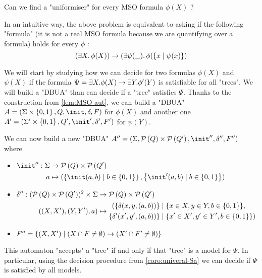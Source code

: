\documentclass{article}
\begin{document}
\begin{problem}
Can we find a "uniformiser" for every MSO formula $\phi(X)$ ?
\end{problem}


In an intuitive way, the above problem is equivalent to asking if the following "formula" (it is not a real MSO formula
because we are quantifying over a formula) holds for every $\phi$ :
\[ (\exists X.\, \phi(X)) \rightarrow (\exists \psi(\_).\, \phi(\left\{x \mid \psi(x)\right\} ) \]

We will start by studying how we can decide for two formulas $\phi(X)$ and $\psi(X)$ if the formula $\Psi = \exists X. \phi (X) \rightarrow \exists Y. \phi' (Y)$
is satisfiable for all "trees". We will build a "DBUA" than can decide if a "tree" satisfies $\Psi$.
Thanks to the construction from \ref{lem:MSO-aut}, we can build a "DBUA" $A = (\Sigma \times \set{0,1}, Q, \init, \delta, F)$ for $\phi(X)$
and another one $A' = (\Sigma' \times \set{0,1}, Q', \init', \delta', F')$ for $\psi(Y)$.

We can now build a new "DBUA" $A'' = (\Sigma, \parts Q \times \parts {Q'}, \init'', \delta'', F'')$ where
\begin{itemize}
	\item$\begin{aligned}[t]
			      \init'' : \Sigma & \to      \parts Q \times \parts {Q'}                                                          \\
			      a                & \mapsto  ( \setdef{ \init(a,b) } {b \in \set{0,1}}, \setdef{ \init'(a,b) } {b \in \set{0,1}})
		      \end{aligned}$

	\item$\begin{aligned}[t]
			      \delta'' : (\mathcal{P}\left(Q\right) \times \mathcal{P}\left(Q'\right))^2 \times \Sigma & \to      \mathcal{P}\left(Q\right) \times \mathcal{P}\left(Q'\right)                                                 \\
			      ((X,X'),(Y,Y'),a)                                        & \mapsto \begin{aligned}
				                                                                         (\{ \delta(x,y,(a,b)) \}  & \mid  \{x \in X, y \in Y, b \in \left\{0,1\right\}\},     \\
				                                                                         \{ \delta'(x',y',(a,b))\} & \mid  \{x' \in X', y' \in Y', b \in \left\{0,1\right\}\})
			                                                                         \end{aligned}
		      \end{aligned}$

	\item $F'' = \left\{(X,X') \mid (X \cap F \neq \emptyset) \rightarrow (X' \cap F' \neq \emptyset)\right\}$
\end{itemize}
This automaton "accepts" a "tree" if and only if that "tree" is a model for $\Psi$. In particular, using the decision procedure
from \ref{coro:univeral-Sa} we can decide if $\Psi$ is satisfied by all models.
\end{document}
